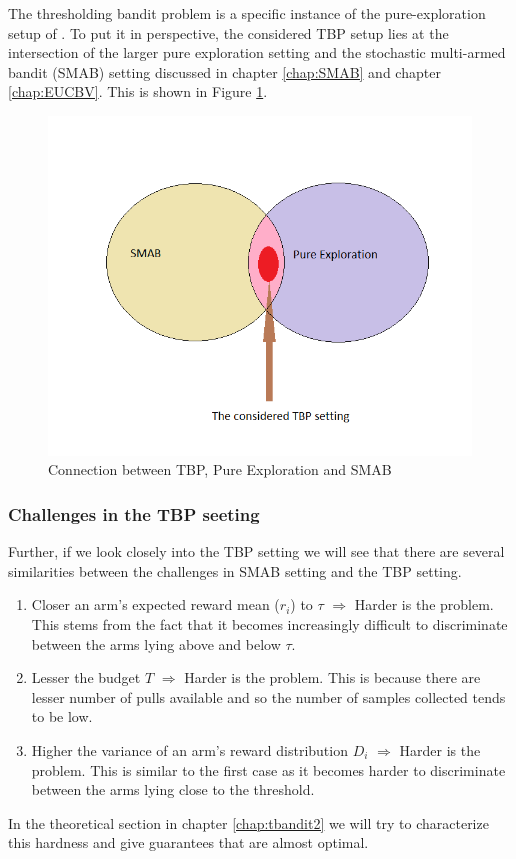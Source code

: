 The thresholding bandit problem is a specific instance of the pure-exploration setup of \citet{chen2014combinatorial}. To put it in perspective, the considered TBP setup lies at the intersection of the larger pure exploration setting and the stochastic multi-armed bandit (SMAB) setting discussed in chapter \ref{chap:SMAB} and chapter \ref{chap:EUCBV}. This is shown in Figure \ref{fig:con}.

\begin{figure}[!th]
\includegraphics[scale=0.7]{Chapter4/img/connection_TBP.png}
\caption{Connection between TBP, Pure Exploration and SMAB}
\label{fig:con}
\end{figure}

\subsubsection{Challenges in the TBP seeting}

Further, if we look closely into the TBP setting we will see that there are several similarities between the challenges in SMAB setting and the TBP setting.

\begin{enumerate}
\item Closer an arm’s expected reward mean ($r_i$) to $\tau$ $\Rightarrow$ Harder is the problem. This stems from the fact that it becomes increasingly difficult to discriminate between the arms lying above and below $\tau$.
\item Lesser the budget $T$ $\Rightarrow$ Harder is the problem. This is because there are lesser number of pulls available and so the number of samples collected tends to be low.
\item Higher the variance of an arm’s reward distribution $D_i$ $\Rightarrow$ Harder is the problem. This is similar to the first case as it becomes harder to discriminate between the arms lying close to the threshold.
\end{enumerate}

In the theoretical section in chapter \ref{chap:tbandit2} we will try to characterize this hardness and give guarantees that are almost optimal.